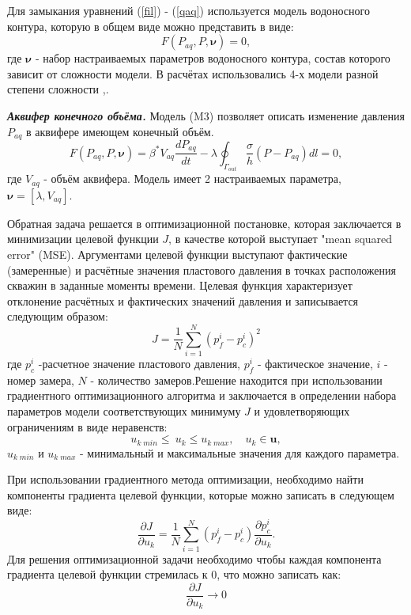 \documentclass[14pt]{article}
\begin{document}
Для замыкания уравнений (\ref{fil}) - (\ref{qaq}) используется модель водоносного контура, которую в общем виде можно представить в виде: 
\begin{equation} \label{f_aq}
F(P_{aq}, P,\boldsymbol{\nu})=0,
\end{equation}
где $\boldsymbol{\nu}$ - набор настраиваемых параметров водоносного контура, состав которого зависит от сложности модели. В расчётах использовались 4-х модели разной степени сложности \cite{dake},\cite{fet}.

\textbf{\textit{Аквифер конечного объёма.}}
Модель (M3) позволяет описать изменение давления $P_{aq}$ в аквифере имеющем конечный объём. 
\begin{equation}
F(P_{aq}, P,\boldsymbol{\nu})=\beta^*V_{aq}\frac{dP_{aq}}{dt} - \lambda\oint_{\Gamma_{out}}\frac{\sigma}{h}(P-P_{aq})dl = 0,
\end{equation}
где $V_{aq}$ - объём аквифера. Модель имеет 2 настраиваемых параметра, $\boldsymbol{\nu} = [\lambda, V_{aq}]$.


Обратная задача решается в оптимизационной постановке, которая заключается в минимизации целевой функции $J$, в качестве которой выступает "mean squared error" (MSE). Аргументами целевой функции выступают фактические (замеренные) и расчётные значения пластового давления в точках расположения скважин в заданные моменты времени. Целевая функция характеризует отклонение расчётных и фактических значений давления и записывается следующим образом:
\begin{equation} \label{mape}
J=\frac{1}{N}\sum_{i=1}^N{\left(p_f^i-p_c^i\right)^2}
\end{equation}
где $p_c^i$ -расчетное значение пластового давления, $p_f^i$ - фактическое значение, $i$ - номер замера, $N$ - количество замеров.Решение находится при использовании градиентного оптимизационного алгоритма и заключается в определении набора параметров модели соответствующих минимуму $J$ и удовлетворяющих ограничениям в виде неравенств:
\begin{equation*}
u_{k\;min}\leq\ u_k\leq u_{k\;max}, \quad u_k \in \boldsymbol{u},
\end{equation*}
$u_{k\;min}$ и $u_{k\;max}$ - минимальный и максимальные значения для каждого параметра.

При использовании градиентного метода оптимизации, необходимо найти компоненты градиента целевой функции, которые можно записать в следующем виде:
\begin{equation}
	\frac{\partial J}{\partial u_k} = \frac{1}{N}\sum_{i=1}^N \left(p_f^i-p_c^i\right)\frac{\partial p_c^i}{\partial u_k}.
\end{equation}
Для решения оптимизационной задачи необходимо чтобы каждая компонента градиента целевой функции стремилась к 0, что можно записать как:
\begin{equation} \label{rp}
\frac{\partial J}{\partial u_k} \rightarrow 0
\end{equation}
\end{document}
